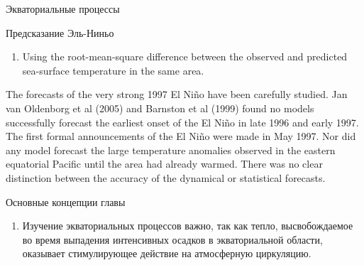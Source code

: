 \begin{chapter}{Экваториальные процессы}
\begin{section}{Предсказание Эль-Ниньо}
\begin{enumerate}
\item
Using the root-mean-square difference between the observed and
predicted sea-surface temperature in the same area.
%
\end{enumerate}

The forecasts of the very strong 1997 El Ni\~{n}o have been carefully
studied. Jan van Oldenborg et al (2005) and Barnston et al (1999)
found no models successfully forecast the earliest onset of the El
Ni\~{n}o in late 1996 and early 1997. The first formal announcements
of the El Ni\~{n}o were made in May 1997. Nor did any model forecast
the large temperature anomalies observed in the eastern equatorial
Pacific until the area had already warmed. There was no clear
distinction between the accuracy of the dynamical or statistical
forecasts.
%
\end{section}

\begin{section}{Основные концепции главы}
\begin{enumerate}
\item
Изучение экваториальных процессов важно, так как тепло, высвобождаемое
во время выпадения интенсивных осадков в экваториальной области,
оказывает стимулирующее действие на атмосферную циркуляцию.
%


\end{enumerate}
\end{section}
\end{chapter}
